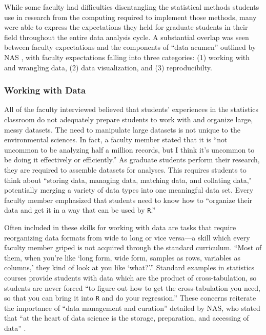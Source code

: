 \documentclass[12pt]{article}
\begin{document}
\quad While some faculty had difficulties disentangling the statistical methods
students use in research from the computing required to implement those methods,
many were able to express the expectations they held for graduate students in
their field throughout the entire data analysis cycle. A substantial overlap 
was seen between faculty expectations and the components of ``data acumen'' 
outlined by NAS \citep{nas}, with faculty expectations falling into three
categories: (1) working with and wrangling data, (2) data visualization, and (3)
reproducibilty.

\subsubsection{Working with Data}  

\quad All of the faculty interviewed believed that students' experiences in the
statistics classroom do not adequately prepare students to work with and
organize large, messy datasets. The need to manipulate large datasets is not
unique to the environmental sciences. In fact, a faculty member stated that it
is ``not uncommon to be analyzing half a million records, but I think it's
uncommon to be doing it effectively or efficiently.'' As graduate students
perform their research, they are required to assemble datasets for analyses.
This requires students to think about ``storing data, managing data, matching
data, and collating data," potentially merging a variety of data types into one
meaningful data set. Every faculty member emphasized that students need to know
how to ``organize their data and get it in a way that can be used by 
\texttt{R}.'' 

\quad Often included in these skills for working with data are tasks that 
require reorganizing data formats from wide to long or vice versa---a skill 
which every faculty member griped is not acquired through the standard 
curriculum. ``Most of them, when you're like `long form, wide form, samples as 
rows, variables as columns,' they kind of look at you like `what?'.'' Standard 
examples in statistics courses provide students with data which are the product
of cross-tabulation, so students are never forced ``to figure out how to get the
cross-tabulation you need, so that you can bring it into \texttt{R} and do your
regression.'' These concerns reiterate the importance of ``data management and 
curation'' detailed by NAS, who stated that ``at the heart of data science is
the storage, preparation, and accessing of data'' \citep[p.\ 26]{nas}. 
\end{document}
